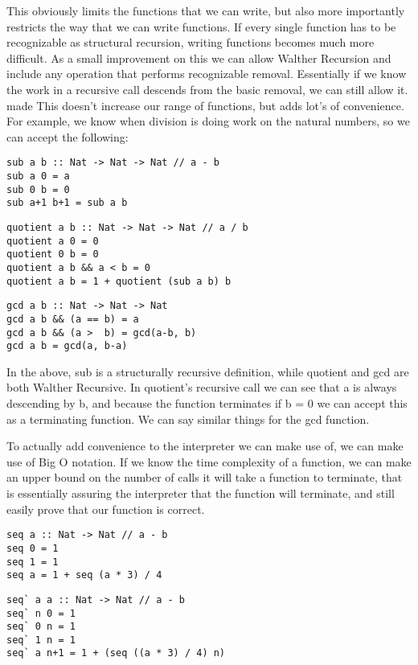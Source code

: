 \documentclass[12pt]{article}
\begin{document}
This obviously limits the functions that we can write, but also more importantly restricts the way that we can write functions. If every single function has to be recognizable as structural recursion, writing functions becomes much more difficult. As a small improvement on this we can allow Walther Recursion and include any operation that performs recognizable removal. Essentially if we know the work in a recursive call descends from the basic removal, we can still allow it. made This doesn't increase our range of functions, but adds lot's of convenience. For example, we know when division is doing work on the natural numbers, so we can accept the following:
\bigskip
\begin{lstlisting}[frame=single,mathescape=true]
sub a b :: Nat -> Nat -> Nat // a - b
sub a 0 = a
sub 0 b = 0
sub a+1 b+1 = sub a b
\end{lstlisting}
\bigskip
\begin{lstlisting}[frame=single,mathescape=true]
quotient a b :: Nat -> Nat -> Nat // a / b
quotient a 0 = 0
quotient 0 b = 0
quotient a b && a < b = 0
quotient a b = 1 + quotient (sub a b) b
\end{lstlisting}
\bigskip
\begin{lstlisting}[frame=single,mathescape=true]
gcd a b :: Nat -> Nat -> Nat
gcd a b && (a == b) = a
gcd a b && (a >  b) = gcd(a-b, b)
gcd a b = gcd(a, b-a)
\end{lstlisting}
In the above, sub is a structurally recursive definition, while quotient and gcd are both Walther Recursive. In quotient's recursive call we can see that a is always descending by b, and because the function terminates if b = 0 we can accept this as a terminating function. We can say similar things for the gcd function.

To actually add convenience to the interpreter we can make use of, we can make use of Big O notation. If we know the time complexity of a function, we can make an upper bound on the number of calls it will take a function to terminate, that is essentially assuring the interpreter that the function will terminate, and still easily prove that our function is correct.
\bigskip
\begin{lstlisting}[frame=single,mathescape=true]
seq a :: Nat -> Nat // a - b
seq 0 = 1
seq 1 = 1
seq a = 1 + seq (a * 3) / 4
\end{lstlisting}
\bigskip
\begin{lstlisting}[frame=single,mathescape=true]
seq` a a :: Nat -> Nat // a - b
seq` n 0 = 1
seq` 0 n = 1
seq` 1 n = 1
seq` a n+1 = 1 + (seq ((a * 3) / 4) n)
\end{lstlisting}
\end{document}
